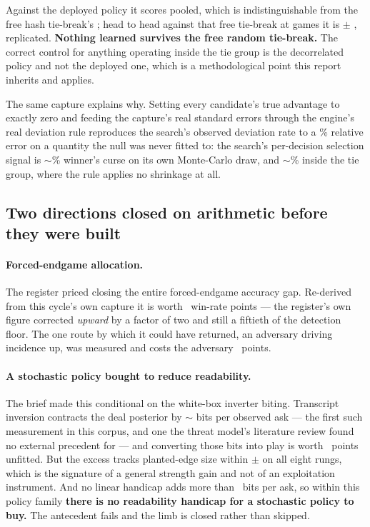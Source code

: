 Against the deployed policy it scores \vsevenKfiveTieOnly{} pooled, which is indistinguishable from the free hash tie-break's \vsevenKfiveFreeTie{}; head to head against that free tie-break at \vsevenPhaseTwoCell{} games it is
\vsevenKfiveHeadToHead{} $\pm$ \vsevenKfivePm{}, replicated. \textbf{Nothing learned survives the free
random tie-break.} The correct control for anything operating inside the tie group is the
decorrelated policy and not the deployed one, which is a methodological point this report inherits
and applies.

The same capture explains why. Setting every candidate's true advantage to exactly zero and feeding
the capture's real standard errors through the engine's real deviation rule reproduces the search's observed deviation rate to a \vsevenCurseRelErr\% relative error on a quantity the null was never fitted to: the
search's per-decision selection signal is $\sim$\vsevenCurseShare\% winner's curse on its own
Monte-Carlo draw, and $\sim$\vsevenCurseTieShare\% inside the tie group, where the rule applies no
shrinkage at all.

\subsection{Two directions closed on arithmetic before they were built}
\label{sec:rejected-arithmetic}

\paragraph{Forced-endgame allocation.} The register priced closing the entire forced-endgame accuracy
gap. Re-derived from this cycle's own capture it is worth \vsevenLthirteenClose{}~win-rate points ---
the register's own figure corrected \emph{upward} by a factor of two and still a fiftieth of the
detection floor. The one route by which it could have returned, an adversary driving incidence up, was measured and costs the adversary \vsevenLthirteenAdvCost{}~points.

\paragraph{A stochastic policy bought to reduce readability.} The brief made this conditional on the
white-box inverter biting. Transcript inversion contracts the deal posterior by $\sim$\vsevenBitsPerAsk{} bits per observed
ask --- the first such measurement in this corpus, and one the threat model's literature review
found no external precedent for --- and
converting those bits into play is worth \vsevenInversionUnfitted{}~points unfitted. But the excess
tracks planted-edge size within $\pm$\vsevenInversionTrack{} on all eight rungs, which is the
signature of a general strength gain and not of an exploitation instrument. And no linear handicap
adds more than \vsevenHandicapBits{}~bits per ask, so within this policy family \textbf{there is no
readability handicap for a stochastic policy to buy.} The antecedent fails and the limb is closed
rather than skipped.

